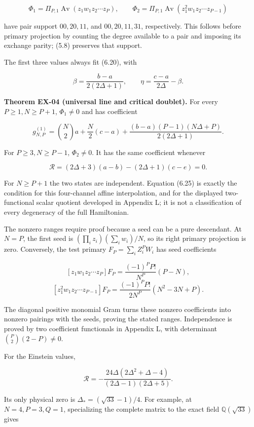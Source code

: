 \[
\Phi_1=\Pi_{P,1}\operatorname{Av}(z_1w_1z_2\cdots z_P),
\qquad
\Phi_2=\Pi_{P,1}\operatorname{Av}(z_1^2w_1z_2\cdots z_{P-1})
\tag{6.22}
\]

have pair support \(00,20,11\), and \(00,20,11,31\), respectively. This follows before primary projection by counting the degree available to a pair and imposing its exchange parity; (5.8) preserves that support.

The first three values always fit (6.20), with

\[
\beta=\frac{b-a}{2(2\Delta+1)},\qquad
\eta=\frac{c-a}{2\Delta}-\beta.
\tag{6.23}
\]

\textbf{Theorem EX-04 (universal line and critical doublet).} For every \(P\ge1,N\ge P+1\), \(\Phi_1\ne0\) and has coefficient

\[
g_{N,P}^{(1)}=\binom N2a+\frac N2(c-a)
+\frac{(b-a)(P-1)(N\Delta+P)}{2(2\Delta+1)}.
\tag{6.24}
\]

For \(P\ge3,N\ge P-1\), \(\Phi_2\ne0\). It has the same coefficient whenever

\[
\mathcal R=(2\Delta+3)(a-b)-(2\Delta+1)(c-e)=0.
\tag{6.25}
\]

For \(N\ge P+1\) the two states are independent. Equation (6.25) is exactly the condition for this four-channel affine interpolation, and for the displayed two-functional scalar quotient developed in Appendix L; it is not a classification of every degeneracy of the full Hamiltonian.

The nonzero ranges require proof because a seed can be a pure descendant. At \(N=P\), the first seed is \((\prod_i z_i)(\sum_iw_i)/N\), so its right primary projection is zero. Conversely, the test primary \(F_P=\sum_iZ_i^PW_i\) has seed coefficients

\[
[z_1w_1z_2\cdots z_P]F_P=
\frac{(-1)^PP!}{N^P}(P-N),
\] \[
[z_1^2w_1z_2\cdots z_{P-1}]F_P=
\frac{(-1)^PP!}{2N^P}(N^2-3N+P).
\tag{6.26}
\]

The diagonal positive monomial Gram turns these nonzero coefficients into nonzero pairings with the seeds, proving the stated ranges. Independence is proved by two coefficient functionals in Appendix L, with determinant \(\binom P2(2-P)\ne0\).

For the Einstein values,

\[
\mathcal R=-\frac{24\Delta(2\Delta^2+\Delta-4)}{(2\Delta-1)(2\Delta+5)}.
\tag{6.27}
\]

Its only physical zero is \(\Delta_*=(\sqrt{33}-1)/4\). For example, at \(N=4,P=3,Q=1\), specializing the complete matrix to the exact field \(\mathbb Q(\sqrt{33})\) gives

